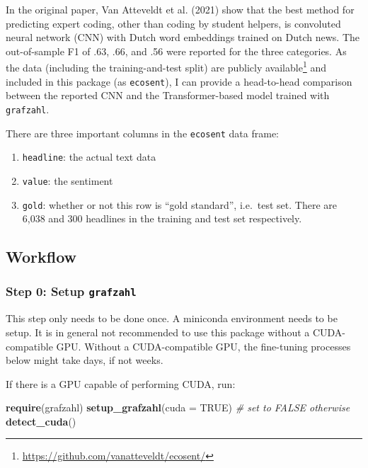 \documentclass[
  english,
  man,floatsintext]{apa6}
\newenvironment{Shaded}{\begin{snugshade}}{\end{snugshade}}
\newcommand{\CommentTok}[1]{\textcolor[rgb]{0.56,0.35,0.01}{\textit{#1}}}
\newcommand{\DataTypeTok}[1]{\textcolor[rgb]{0.13,0.29,0.53}{#1}}
\newcommand{\KeywordTok}[1]{\textcolor[rgb]{0.13,0.29,0.53}{\textbf{#1}}}
\newcommand{\NormalTok}[1]{#1}
\newcommand{\OtherTok}[1]{\textcolor[rgb]{0.56,0.35,0.01}{#1}}
\providecommand{\tightlist}{%
  \setlength{\itemsep}{0pt}\setlength{\parskip}{0pt}}
\begin{document}
In the original paper, Van Atteveldt et al. (2021) show that the best method for predicting expert coding, other than coding by student helpers, is convoluted neural network (CNN) with Dutch word embeddings trained on Dutch news. The out-of-sample F1 of .63, .66, and .56 were reported for the three categories. As the data (including the training-and-test split) are publicly available\footnote{\url{https://github.com/vanatteveldt/ecosent/}} and included in this package (as \texttt{ecosent}), I can provide a head-to-head comparison between the reported CNN and the Transformer-based model trained with \texttt{grafzahl}.

There are three important columns in the \texttt{ecosent} data frame:

\begin{enumerate}
\def\labelenumi{\arabic{enumi}.}
\tightlist
\item
  \texttt{headline}: the actual text data
\item
  \texttt{value}: the sentiment
\item
  \texttt{gold}: whether or not this row is ``gold standard'', i.e.~test set. There are 6,038 and 300 headlines in the training and test set respectively.
\end{enumerate}

\hypertarget{workflow}{%
\subsection{Workflow}\label{workflow}}

\hypertarget{step-0-setup-grafzahl}{%
\subsubsection{\texorpdfstring{Step 0: Setup \texttt{grafzahl}}{Step 0: Setup grafzahl}}\label{step-0-setup-grafzahl}}

This step only needs to be done once. A miniconda environment needs to be setup. It is in general not recommended to use this package without a CUDA-compatible GPU. Without a CUDA-compatible GPU, the fine-tuning processes below might take days, if not weeks.

If there is a GPU capable of performing CUDA, run:

\begin{Shaded}
\begin{Highlighting}[]
\KeywordTok{require}\NormalTok{(grafzahl)}
\KeywordTok{setup\_grafzahl}\NormalTok{(}\DataTypeTok{cuda =} \OtherTok{TRUE}\NormalTok{) }\CommentTok{\# set to FALSE otherwise}
\KeywordTok{detect\_cuda}\NormalTok{()}
\end{Highlighting}
\end{Shaded}
\end{document}
